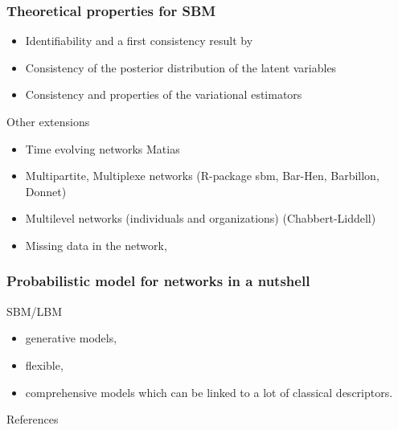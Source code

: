 \documentclass[compress,10pt]{beamer}
\begin{document}
\begin{frame}\frametitle{Theoretical properties for SBM}
\begin{itemize}
\item Identifiability and a first consistency result by \color{blue} \cite{celisse2012consistency} \color{black}
\item Consistency of the posterior distribution of the latent variables \color{blue} \cite{mariadassou2015convergence} \color{black}
\item Consistency and properties of the variational estimators \color{blue} \cite{bickel2013asymptotic} \color{black}
\end{itemize}
\end{frame}
\begin{frame}{Other extensions}

\begin{itemize}
\item  Time evolving networks \textcolor{mygreen}{Matias} 
\item  Multipartite, Multiplexe networks (\textcolor{mygreen}{R-package  sbm, Bar-Hen, Barbillon, Donnet}) 
\item Multilevel networks (individuals and organizations)  (\textcolor{mygreen}{Chabbert-Liddell})
 \item Missing data in the network,
\end{itemize}
\end{frame}

\begin{frame}
 \frametitle{Probabilistic model for networks in a nutshell}
 
 SBM/LBM
 \begin{itemize}
  \item generative models,
  \item flexible,
  \item comprehensive models which can be linked to a lot of classical descriptors.
  
 \end{itemize}
\end{frame}


\begin{frame}[allowframebreaks]{References}

 \small{}
  \end{frame}
  
  
  
\end{document}
